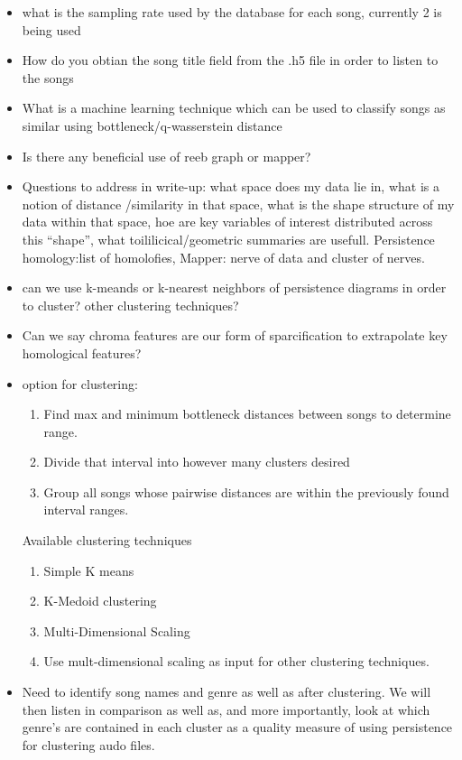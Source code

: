 \documentclass[11pt, a4paper]{article}
\begin{document}
  \begin{itemize}
  \item what is the sampling rate used by the database for each song, currently 2 is being used
  \item How do you obtian the song title field from the .h5 file in order to listen to the songs
  \item What is a machine learning technique which can be used to classify songs as similar using bottleneck/q-wasserstein distance
  \item Is there any beneficial use of reeb graph or mapper?
  \item Questions to address in write-up: what space does my data lie in, what is a notion of distance /similarity in that space, what is the shape structure of my data within that space, hoe are key variables of interest distributed across this ``shape'', what toililicical/geometric summaries are usefull. Persistence homology:list of homolofies, Mapper: nerve of data and cluster of nerves.
  \item can we use k-meands or k-nearest neighbors of persistence diagrams in order to cluster? other clustering techniques?
  \item Can we say chroma features are our form of sparcification to extrapolate key homological features?
  \item option for clustering:
    \begin{enumerate}
    \item Find max and minimum bottleneck distances between songs to determine range.
    \item Divide that interval into however many clusters desired
    \item Group all songs whose pairwise distances are within the previously found interval ranges.
    \end{enumerate}
    Available clustering techniques
    \begin{enumerate}
    \item Simple K means
    \item K-Medoid clustering
    \item Multi-Dimensional Scaling
    \item Use mult-dimensional scaling as input for other clustering techniques. 
    \end{enumerate}
  \item Need to identify song names and genre as well as after clustering. We will then listen in comparison as well as, and more importantly, look at which genre's are contained in each cluster as a quality measure of using persistence for clustering audo files.
  \end{itemize}
  
\end{document}
